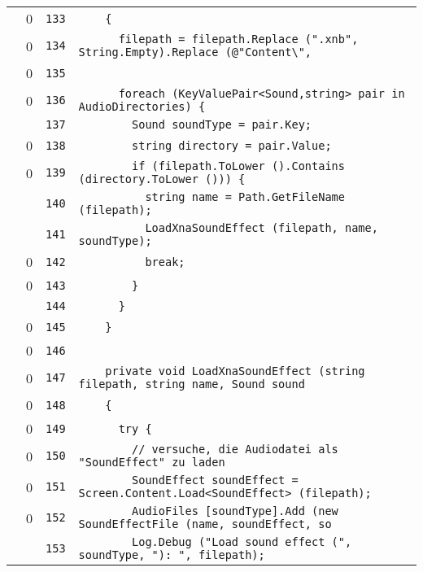 \documentclass[a4paper,10pt]{article}
\begin{document}
\begin{longtable}[l]{lrrl}
\cellcolor{red} & 0 & \verb~133~ & \verb~    {~\\
\cellcolor{red} & 0 & \verb~134~ & \verb~      filepath = filepath.Replace (".xnb", String.Empty).Replace (@"Content\",~\\
\cellcolor{red} & 0 & \verb~135~ & \verb~~\\
\cellcolor{red} & 0 & \verb~136~ & \verb~      foreach (KeyValuePair<Sound,string> pair in AudioDirectories) {~\\
\cellcolor{gray} &  & \verb~137~ & \verb~        Sound soundType = pair.Key;~\\
\cellcolor{red} & 0 & \verb~138~ & \verb~        string directory = pair.Value;~\\
\cellcolor{red} & 0 & \verb~139~ & \verb~        if (filepath.ToLower ().Contains (directory.ToLower ())) {~\\
\cellcolor{gray} &  & \verb~140~ & \verb~          string name = Path.GetFileName (filepath);~\\
\cellcolor{gray} &  & \verb~141~ & \verb~          LoadXnaSoundEffect (filepath, name, soundType);~\\
\cellcolor{red} & 0 & \verb~142~ & \verb~          break;~\\
\cellcolor{red} & 0 & \verb~143~ & \verb~        }~\\
\cellcolor{gray} &  & \verb~144~ & \verb~      }~\\
\cellcolor{red} & 0 & \verb~145~ & \verb~    }~\\
\cellcolor{red} & 0 & \verb~146~ & \verb~~\\
\cellcolor{red} & 0 & \verb~147~ & \verb~    private void LoadXnaSoundEffect (string filepath, string name, Sound sound~\\
\cellcolor{red} & 0 & \verb~148~ & \verb~    {~\\
\cellcolor{red} & 0 & \verb~149~ & \verb~      try {~\\
\cellcolor{red} & 0 & \verb~150~ & \verb~        // versuche, die Audiodatei als "SoundEffect" zu laden~\\
\cellcolor{red} & 0 & \verb~151~ & \verb~        SoundEffect soundEffect = Screen.Content.Load<SoundEffect> (filepath);~\\
\cellcolor{red} & 0 & \verb~152~ & \verb~        AudioFiles [soundType].Add (new SoundEffectFile (name, soundEffect, so~\\
\cellcolor{gray} &  & \verb~153~ & \verb~        Log.Debug ("Load sound effect (", soundType, "): ", filepath);~\\

\end{longtable}
\end{document}
